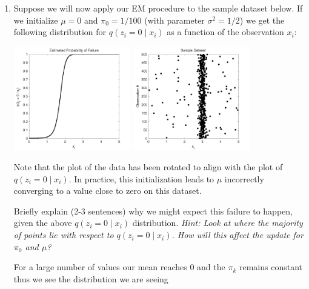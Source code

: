 \begin{enumerate}
\item {} Suppose we will now apply our EM procedure to the
  sample dataset below. If we initialize $\mu = 0$ and $\pi_0 = 1/100$
  (with parameter $\sigma^2 = 1/2$) we get the following distribution
  for $q(z_i = 0 \mid x_i)$ as a function of the observation $x_i$:
  \begin{center}
    \includegraphics[width=0.4\textwidth]{images/q_mean0.png}
    \includegraphics[width=0.4\textwidth]{images/range2.png}
  \end{center}
  Note that the plot of the data has been rotated to align with the
  plot of $q(z_i = 0 \mid x_i)$. In practice, this initialization
  leads to $\mu$ incorrectly converging to a value close to zero on
  this dataset.

  Briefly explain (2-3 sentences) why we might expect this failure to
  happen, given the above $q(z_i = 0 \mid x_i)$ distribution. {\em
    Hint: Look at where the majority of points lie with respect to
    $q(z_i = 0 \mid x_i)$. How will this affect the update for $\pi_0$
    and $\mu$?} 

For a large number of values our mean reaches 0 and the $\pi_k $ remains constant thus we see the distribution we are seeing\\

\end{enumerate}
